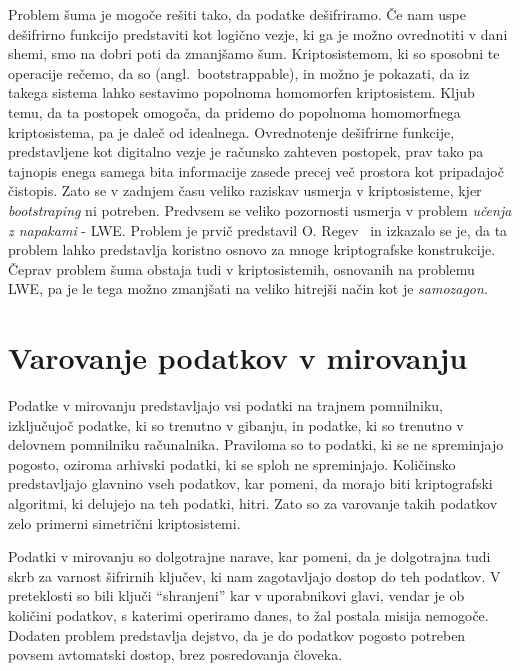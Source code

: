 \documentclass[12pt,a4paper,openany,tikz]{book}
\theoremstyle{plain}
\theoremstyle{definition}
\begin{document}
Problem šuma je mogoče rešiti tako, da podatke dešifriramo. Če nam uspe dešifrirno funkcijo predstaviti kot logično vezje, ki ga je možno ovrednotiti v dani shemi, smo na dobri poti da zmanjšamo šum. Kriptosistemom, ki so sposobni te operacije rečemo, da so  (angl.\ bootstrappable), in možno je pokazati, da iz takega sistema lahko sestavimo popolnoma homomorfen kriptosistem. Kljub temu, da ta postopek omogoča, da pridemo do popolnoma homomorfnega kriptosistema, pa je daleč od idealnega. Ovrednotenje dešifrirne funkcije, predstavljene kot digitalno vezje je računsko zahteven postopek, prav tako pa tajnopis enega samega bita informacije zasede precej več prostora kot pripadajoč čistopis. Zato se v zadnjem času veliko raziskav usmerja v kriptosisteme, kjer \textit{bootstraping} ni potreben. Predvsem se veliko pozornosti usmerja v problem \textit{učenja z napakami} - \acrfull{LWE}. Problem je prvič predstavil O. Regev~\cite{regev2009lattices} in izkazalo se je, da ta problem lahko predstavlja koristno osnovo za mnoge kriptografske konstrukcije. Čeprav problem šuma obstaja tudi v kriptosistemih, osnovanih na problemu \acrshort{LWE}, pa je le tega možno zmanjšati na veliko hitrejši način kot je \textit{samozagon}.

\section{Varovanje podatkov v mirovanju}
\label{sec:Varovanje podatkov v mirovanju}

Podatke v mirovanju predstavljajo vsi podatki na trajnem pomnilniku, izključujoč podatke, ki so trenutno v gibanju, in podatke, ki so trenutno v delovnem pomnilniku računalnika. Praviloma so to podatki, ki se ne spreminjajo pogosto, oziroma arhivski podatki, ki se sploh ne spreminjajo. Količinsko predstavljajo glavnino vseh podatkov, kar pomeni, da morajo biti kriptografski algoritmi, ki delujejo na teh podatki, hitri. Zato so za varovanje takih podatkov zelo primerni simetrični kriptosistemi.

Podatki v mirovanju so dolgotrajne narave, kar pomeni, da je dolgotrajna tudi skrb za varnost šifrirnih ključev, ki nam zagotavljajo dostop do teh podatkov. V preteklosti so bili ključi ``shranjeni'' kar v uporabnikovi glavi, vendar je ob količini podatkov, s katerimi operiramo danes, to žal postala misija nemogoče. Dodaten problem predstavlja dejstvo, da je do podatkov pogosto potreben povsem avtomatski dostop, brez posredovanja človeka.
\end{document}
